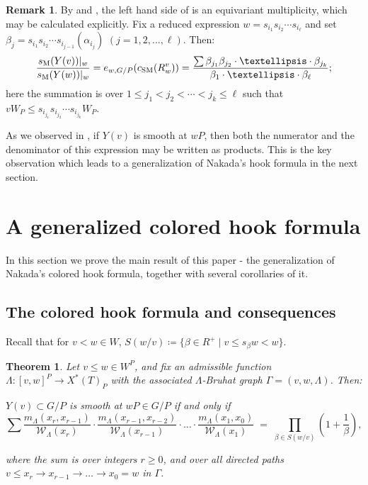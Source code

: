 \documentclass[11pt]{article}
\newtheorem{theorem}[theo]{Theorem}
\theoremstyle{definition}
\newtheorem{remark}[theo]{Remark}
\numberwithin{equation}{section}
\newcommand{\csm}{c_{\mathrm{SM}}}
\newcommand{\ssm}{s_{\mathrm{M}}}
\begin{document}
\begin{remark} By  and , the left hand side of  
is an equivariant multiplicity, which may be calculated explicitly. Fix a reduced expression $w=s_{i_1} s_{i_2} \cdots s_{i_\ell}$
and set $\beta_j=s_{i_1} s_{i_2} \cdots s_{i_{j-1}}(\alpha_{i_j})$
$(j=1,2,\ldots,\ell)$. Then:
\begin{equation}\label{equ:explicit} \frac{\ssm(Y(v))|_w}{\ssm(Y(w))|_w} = 
e_{w,G/P}(\csm(R_w^v)) =\frac{\sum \beta_{j_1}\beta_{j_2}\cdot \ldots \cdot \beta_{j_k}}{\beta_1\cdot \ldots \cdot \beta_\ell} \/;
\end{equation}
here 
the summation is over $ 1\leq j_1<j_2<\cdots <j_k\leq \ell$ such that 
$vW_P\leq s_{i_{j_1}}s_{i_{j_2}}\cdots s_{i_{j_k}}W_P$.

As we observed in , if $Y(v)$ is smooth at $wP$, then 
both the numerator and the denominator of this expression may be written as products.
This is the key observation which leads to a generalization of Nakada's hook formula in the next section.\end{remark}


\section{A generalized colored hook formula}\label{sec:genhook}
In this section we prove the main result of this paper - 
the generalization of Nakada's colored hook formula, together with several corollaries 
of it.
\subsection{The colored hook formula and consequences}\label{sec:col-and-conseq}
Recall that for $v < w \in W$, $S(w/v)\coloneqq \{\beta\in R^+\mid v\le s_\beta w<w\}$.
\begin{theorem}\label{thm:genNak} Let $v\leq  w\in W^P$, and fix an admissible 
	function $\Lambda:[v,w]^P\to X^{*}(T)_P$ with the associated 
	$\Lambda$-Bruhat graph $\Gamma=(v,w,\Lambda)$. Then: 
	\begin{center}
		$Y(v)\subset G/P$ is smooth at $wP\in G/P$  if and only if
		\[
		\sum\frac{m_\Lambda(x_r,x_{r-1})}{\mathcal{W}_\Lambda(x_r)}\cdot \frac{m_\Lambda(x_{r-1},x_{r-2})}{\mathcal{W}_\Lambda(x_{r-1})}\cdot \ldots \cdot \frac{m_\Lambda(x_{1},x_{0})}{\mathcal{W}_\Lambda(x_{1})}
		\;=\;
		\prod_{\beta \in S(w/v)} \left(1+\frac{1}{\beta}\right),\]
	\end{center}
	where the sum is over integers $r \ge 0$, and over all directed paths 
	$v\leq x_r \overset{}{\to} x_{r-1} \overset{}{\to} \ldots \overset{}{\to} x_0 = w$ in $\Gamma$.
\end{theorem}
\end{document}
